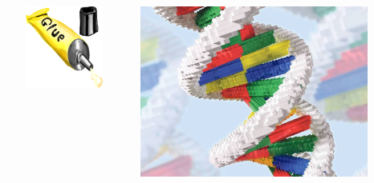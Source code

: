 \documentclass{beamer}
\begin{document}
{\begin{frame}[t]
{\begin{columns}
\begin{column}{0.3\textwidth}
        \end{column}
        \begin{column}{0.025\textwidth}
          \textbf{\textcolor{white}{\Large +}}
        \end{column}
        \begin{column}{0.25\textwidth}
          \centering
          \includegraphics[width=\textwidth]{eyecandy/Glue.png}
        \end{column}
        \begin{column}{0.025\textwidth}
          \textbf{\textcolor{white}{\Large =}}
        \end{column}
        \begin{column}{0.4\textwidth}
          \centering
          \includegraphics[width=0.9\textwidth]{eyecandy/LEGO-DNS.jpg}

\end{column}
\end{columns}}
\end{frame}}
\end{document}
